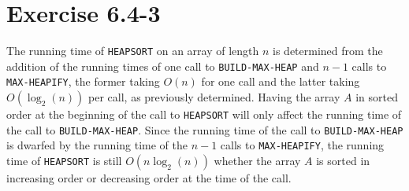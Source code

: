 \documentclass{article}
\begin{document}
\section*{Exercise 6.4-3}

The running time of \texttt{HEAPSORT} on an array of length $n$ is determined from the addition of the running times of one call to \texttt{BUILD-MAX-HEAP} and $n - 1$ calls to \texttt{MAX-HEAPIFY}, the former taking $O(n)$ for one call and the latter taking $O(\log_2(n))$ per call, as previously determined. Having the array $A$ in sorted order at the beginning of the call to \texttt{HEAPSORT} will only affect the running time of the call to \texttt{BUILD-MAX-HEAP}. Since the running time of the call to \texttt{BUILD-MAX-HEAP} is dwarfed by the running time of the $n - 1$ calls to \texttt{MAX-HEAPIFY}, the running time of \texttt{HEAPSORT} is still $O(n \log_2(n))$ whether the array $A$ is sorted in increasing order or decreasing order at the time of the call.
\end{document}
